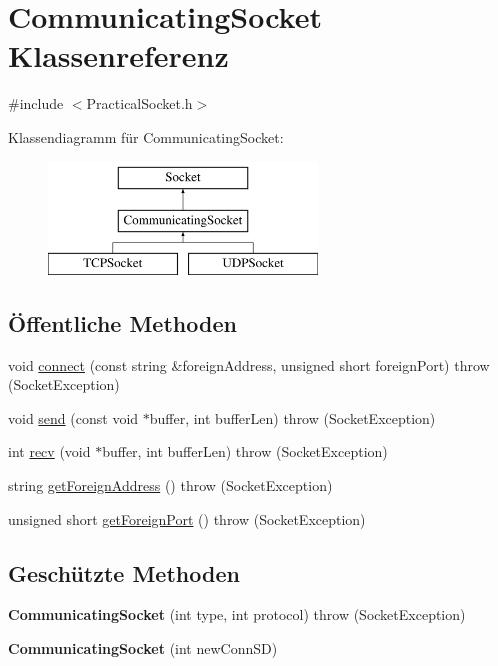 \hypertarget{classCommunicatingSocket}{\section{Communicating\-Socket Klassenreferenz}
\label{classCommunicatingSocket}
}


{\ttfamily \#include $<$Practical\-Socket.\-h$>$}

Klassendiagramm für Communicating\-Socket\-:\begin{figure}[H]
\begin{center}
\leavevmode
\includegraphics[height=3.000000cm]{classCommunicatingSocket}
\end{center}
\end{figure}
\subsection*{Öffentliche Methoden}
\begin{DoxyCompactItemize}
\item 
void \hyperlink{classCommunicatingSocket_a9192374d9baab8e189860aa8d913683c}{connect} (const string \&foreign\-Address, unsigned short foreign\-Port)  throw (\-Socket\-Exception)
\item 
void \hyperlink{classCommunicatingSocket_aca4e86085c064641e86ae24ea29bbb94}{send} (const void $\ast$buffer, int buffer\-Len)  throw (\-Socket\-Exception)
\item 
int \hyperlink{classCommunicatingSocket_a7cf1fd470c0060171b68df9f68c7bd01}{recv} (void $\ast$buffer, int buffer\-Len)  throw (\-Socket\-Exception)
\item 
string \hyperlink{classCommunicatingSocket_a13f9eca30ef56836cf23c163c848c09e}{get\-Foreign\-Address} ()  throw (\-Socket\-Exception)
\item 
unsigned short \hyperlink{classCommunicatingSocket_a184fbb4775184b87ebd886a5587eb1a3}{get\-Foreign\-Port} ()  throw (\-Socket\-Exception)
\end{DoxyCompactItemize}
\subsection*{Geschützte Methoden}
\begin{DoxyCompactItemize}
\item 
\hypertarget{classCommunicatingSocket_a0017517b8d6e761fde0c40475af3b2ab}{{\bfseries Communicating\-Socket} (int type, int protocol)  throw (\-Socket\-Exception)}\label{classCommunicatingSocket_a0017517b8d6e761fde0c40475af3b2ab}

\item 
\hypertarget{classCommunicatingSocket_a27d758db782b3be7d28741e92cb613d1}{{\bfseries Communicating\-Socket} (int new\-Conn\-S\-D)}\label{classCommunicatingSocket_a27d758db782b3be7d28741e92cb613d1}

\end{DoxyCompactItemize}
